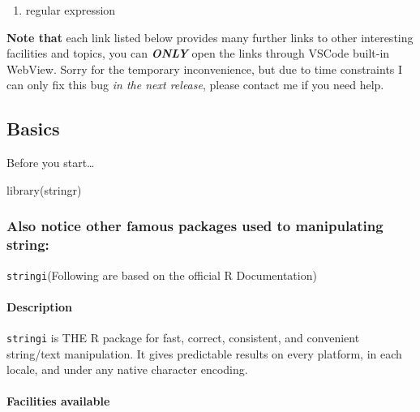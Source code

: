 \documentclass[
]{article}
\newenvironment{Shaded}{}{}
\newcommand{\FunctionTok}[1]{\textcolor[rgb]{0.02,0.16,0.49}{#1}}
\newcommand{\NormalTok}[1]{#1}
\begin{document}
\begin{enumerate}
\def\labelenumi{\arabic{enumi}.}
\item
  regular expression
\end{enumerate}

\textbf{Note that} each link listed below provides many further links to
other interesting facilities and topics, you can \emph{\textbf{ONLY}}
open the links through VSCode built-in WebView. Sorry for the temporary
inconvenience, but due to time constraints I can only fix this bug
\emph{in the next release}, please contact me if you need help.

\hypertarget{basics}{%
\subsection{Basics}\label{basics}}

Before you start\ldots{}

\begin{Shaded}
\begin{Highlighting}[]
\FunctionTok{library}\NormalTok{(stringr)}
\end{Highlighting}
\end{Shaded}

\hypertarget{also-notice-other-famous-packages-used-to-manipulating-string}{%
\subsubsection{Also notice other famous packages used to manipulating
string:}\label{also-notice-other-famous-packages-used-to-manipulating-string}}

\texttt{stringi}(Following are based on the official R Documentation)

\hypertarget{description}{%
\paragraph{\texorpdfstring{\textbf{Description}}{Description}}\label{description}}

\texttt{stringi} is THE R package for fast, correct, consistent, and
convenient string/text manipulation. It gives predictable results on
every platform, in each locale, and under any native character encoding.

\hypertarget{facilities-available}{%
\paragraph{\texorpdfstring{\textbf{Facilities
available}}{Facilities available}}\label{facilities-available}}
\end{document}
